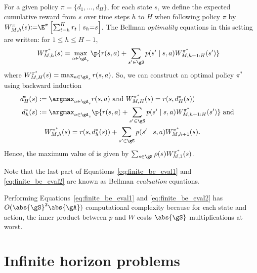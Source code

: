 For a given policy $\pi=\{d_1,\dots,d_H\}$, for each state $s$, we define the expected cumulative reward from $s$ over time steps $h$ to $H$ when following policy $\pi$ by $W_{M,h}^\pi(s){:=}\E^\pi\left[\sum_{t=h}^H r_t\mid s_h{=}s\right]$.
The Bellman \emph{optimality} equations in this setting are written: for $1\le h\le H-1$,
\begin{equation}
    \label{eq:finite_be_opt}
    W_{M,h}^{\pi^*}(s) = \max_{a\in\gA_s}\p{r(s,a)+\sum_{s'\in\gS}p(s'\mid s,a)W_{M,h+1:H}^{\pi^*}(s')}
\end{equation}
where $W_{M,H}^{\pi^*}(s) =\max_{a\in\gA_s}r(s,a)$.
So, we can construct an optimal policy $\pi^*$ using backward induction
\begin{align}
    d_H^*(s) &:=\argmax_{a\in\gA_s}r(s,a) \text{ and } W_{M,H}^{\pi^*}(s) = r(s, d_H^*(s)) \label{eq:finite_be_eval1}\\
    d_h^*(s) &:=\argmax_{a\in\gA_s}\p{r(s,a)+\sum_{s'\in\gS}p(s'\mid s,a)W_{M,h+1:H}^{\pi^*}(s')} \text{ and } \nonumber\\
             &\quad W_{M,h}^{\pi^*}(s) = r(s, d_h^*(s)) +\sum_{s'\in\gS}p(s' \mid s,a)W_{M,h+1}^{\pi^*}(s). \label{eq:finite_be_eval2}
\end{align}
Hence, the maximum value of  is given by $\sum_{s\in\gS}\rho(s)W^{\pi^*}_{M,1}(s)$.

Note that the last part of Equations~\eqref{eq:finite_be_eval1} and \eqref{eq:finite_be_eval2} are known as Bellman \emph{evaluation} equations.

Performing Equations~\eqref{eq:finite_be_eval1} and \eqref{eq:finite_be_eval2} has $O(\abs{\gS}^2\abs{\gA})$ computational complexity because for each state and action, the inner product between $p$ and $W$ costs $\abs{\gS}$ multiplications at worst.

\section{Infinite horizon problems}

